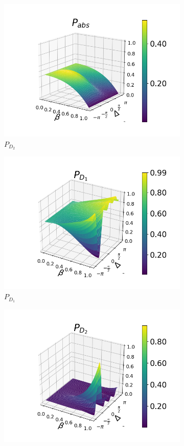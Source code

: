 \documentclass[12pt]{book}
\begin{document}
\begin{figure}[H]
\begin{subfigure}[b]{0.45\linewidth}
\includegraphics[width=\linewidth]{images/pabs_3.png}
\caption{$P_{D_{2}}$ }
\label{fig:BS1}
\end{subfigure}
\begin{subfigure}[b]{0.45\linewidth}
\includegraphics[width=\linewidth]{images/pd1_5.png}
\caption{$P_{D_{1}}$ }
\label{fig:BS1}
\end{subfigure}
\begin{subfigure}[b]{0.45\linewidth}
\includegraphics[width=\linewidth]{images/pd2_5.png}

\end{subfigure}
\end{figure}
\end{document}
